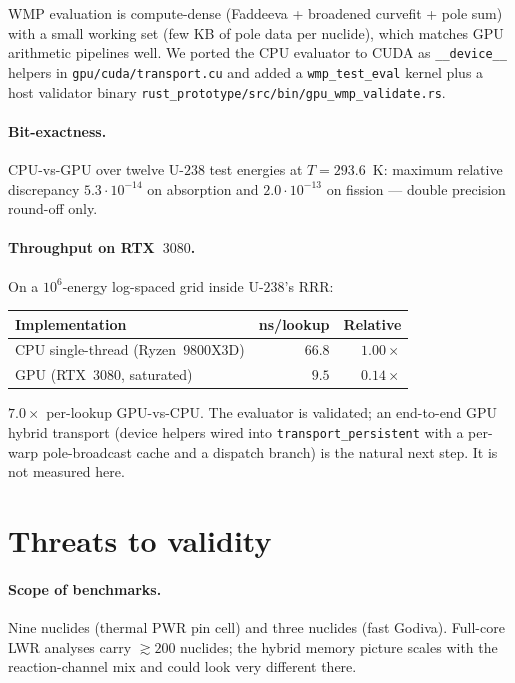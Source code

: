 \documentclass[11pt,a4paper]{article}
\begin{document}
WMP evaluation is compute-dense (Faddeeva + broadened
curvefit + pole sum) with a small working set (few KB of
pole data per nuclide), which matches GPU arithmetic
pipelines well. We ported the CPU evaluator to CUDA as
\texttt{\_\_device\_\_} helpers in
\texttt{gpu/cuda/transport.cu} and added a
\texttt{wmp\_test\_eval} kernel plus a host validator binary
\texttt{rust\_prototype/src/bin/gpu\_wmp\_validate.rs}.

\paragraph{Bit-exactness.}
CPU-vs-GPU over twelve U-$238$ test energies at $T = 293.6$~K:
maximum relative discrepancy $5.3 \cdot 10^{-14}$ on
absorption and $2.0 \cdot 10^{-13}$ on fission --- double
precision round-off only.

\paragraph{Throughput on RTX~$3080$.}
On a $10^6$-energy log-spaced grid inside U-$238$'s RRR:

\begin{center}
\begin{tabular}{@{}lrr@{}}
\toprule
Implementation & ns/lookup & Relative \\
\midrule
CPU single-thread (Ryzen~$9800$X3D) & $66.8$ & $1.00\times$ \\
GPU (RTX~$3080$, saturated)         & $9.5$  & $0.14\times$ \\
\bottomrule
\end{tabular}
\end{center}

$7.0\times$ per-lookup GPU-vs-CPU. The evaluator is
validated; an end-to-end GPU hybrid transport (device
helpers wired into \texttt{transport\_persistent} with a
per-warp pole-broadcast cache and a dispatch branch) is the
natural next step. It is not measured here.

\section{Threats to validity}
\label{sec:threats}

\paragraph{Scope of benchmarks.}
Nine nuclides (thermal PWR pin cell) and three nuclides (fast
Godiva). Full-core LWR analyses carry $\gtrsim 200$ nuclides;
the hybrid memory picture scales with the reaction-channel
mix and could look very different there.
\end{document}
